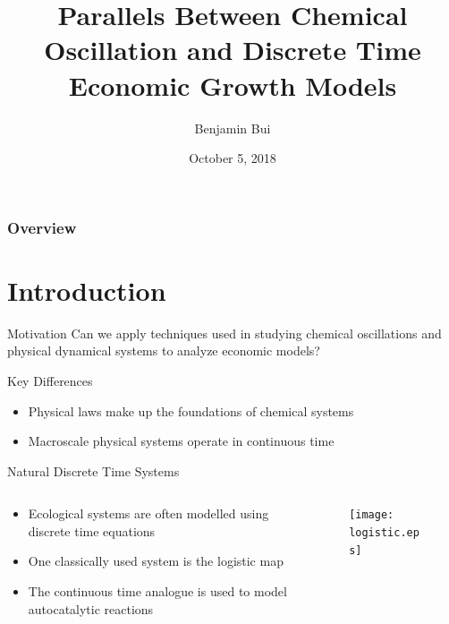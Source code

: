 \documentclass{beamer}
\title{Parallels Between Chemical Oscillation and Discrete Time Economic Growth Models}
\author{Benjamin Bui}
\date{October 5, 2018}
\begin{document}
\begin{frame}
	\titlepage
\end{frame}

\begin{frame}
	\frametitle{Overview}
	\tableofcontents
\end{frame}

\section{Introduction}
\begin{frame}{Motivation}
	Can we apply techniques used in studying chemical oscillations and physical dynamical systems to analyze economic models?
\end{frame}

\begin{frame}{Key Differences}
	\begin{itemize}
		\item
			Physical laws make up the foundations of chemical systems
		\pause
		\item
			Macroscale physical systems operate in continuous time
	\end{itemize}
\end{frame}

\begin{frame}{Natural Discrete Time Systems}
	\begin{columns}
		\begin{column}{0.5\textwidth}
			\begin{itemize}
					\item
						Ecological systems are often modelled using discrete time equations
					\pause
					\item
						One classically used system is the logistic map\autocite{Maier2010}
					\item
						The continuous time analogue is used to model autocatalytic reactions
				\end{itemize}
		\end{column}
		\begin{column}{0.5\textwidth}
			\begin{figure}
				\centering
				\texttt{[image: logistic.eps]}
			\end{figure}
		\end{column}
	\end{columns}
\end{frame}
\end{document}
